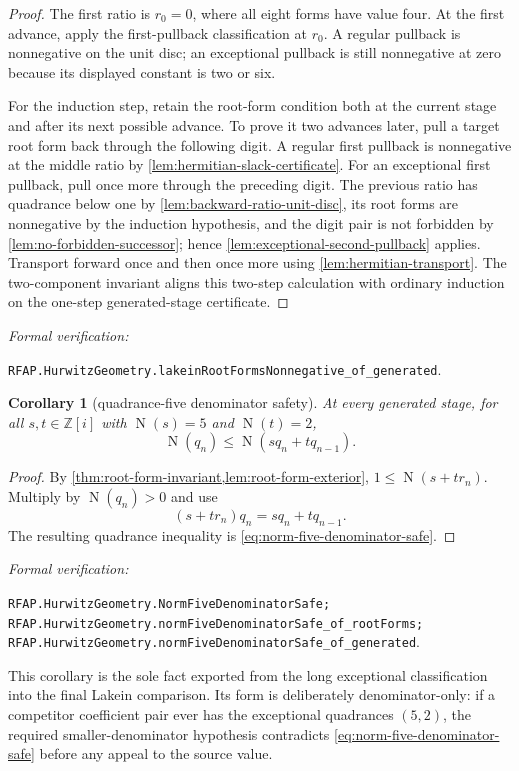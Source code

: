 \documentclass[11pt]{article}
\newtheorem{corollary}[corollary]{Corollary}
\newcommand{\Zi}{\mathbb{Z}[i]}
\newcommand{\Norm}[1]{\operatorname{N}\!\left(#1\right)}
\newcommand{\leanref}[1]{\par\smallskip\noindent
  \emph{Formal verification:}\par\nobreak
  {\raggedright\nolinkurl{#1}.\par}}
\begin{document}
\begin{proof}
The first ratio is $r_0=0$, where all eight forms have value four.  At the
first advance, apply the first-pullback classification at $r_0$.  A regular
pullback is nonnegative on the unit disc; an exceptional pullback is still
nonnegative at zero because its displayed constant is two or six.

For the induction step, retain the root-form condition both at the current
stage and after its next possible advance.  To prove it two advances later,
pull a target root form back through the following digit.  A regular first
pullback is nonnegative at the middle ratio by
\cref{lem:hermitian-slack-certificate}.  For an exceptional first pullback,
pull once more through the preceding digit.  The previous ratio has
quadrance below one by \cref{lem:backward-ratio-unit-disc}, its root forms are
nonnegative by the induction hypothesis, and the digit pair is not forbidden
by \cref{lem:no-forbidden-successor}; hence
\cref{lem:exceptional-second-pullback} applies.  Transport forward once and
then once more using \cref{lem:hermitian-transport}.  The two-component
invariant aligns this two-step calculation with ordinary induction on the
one-step generated-stage certificate.
\end{proof}

\leanref{RFAP.HurwitzGeometry.lakeinRootFormsNonnegative_of_generated}

\begin{corollary}[quadrance-five denominator safety]
\label{cor:norm-five-denominator-safe}
At every generated stage, for all $s,t\in\Zi$ with
$\Norm s=5$ and $\Norm t=2$,
\begin{equation}
\label{eq:norm-five-denominator-safe}
        \Norm{q_n}\le\Norm{s q_n+t q_{n-1}}.
\end{equation}
\end{corollary}

\begin{proof}
By \cref{thm:root-form-invariant,lem:root-form-exterior},
$1\le\Norm{s+t r_n}$.  Multiply by $\Norm{q_n}>0$ and use
\[
                    (s+t r_n)q_n=sq_n+tq_{n-1}.
\]
The resulting quadrance inequality is
\eqref{eq:norm-five-denominator-safe}.
\end{proof}

\leanref{RFAP.HurwitzGeometry.NormFiveDenominatorSafe;
RFAP.HurwitzGeometry.normFiveDenominatorSafe_of_rootForms;
RFAP.HurwitzGeometry.normFiveDenominatorSafe_of_generated}

This corollary is the sole fact exported from the long exceptional
classification into the final Lakein comparison.  Its form is deliberately
denominator-only: if a competitor coefficient pair ever has the exceptional
quadrances $(5,2)$, the required smaller-denominator hypothesis contradicts
\eqref{eq:norm-five-denominator-safe} before any appeal to the source value.
\end{document}
